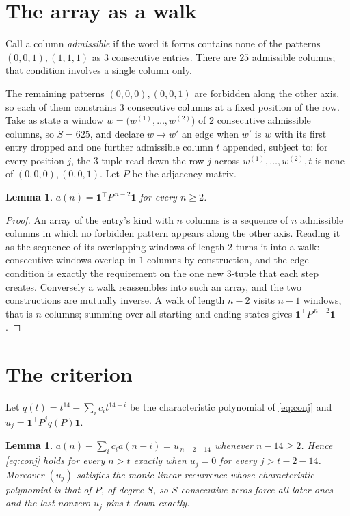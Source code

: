 \documentclass[11pt,a4paper]{article}
\theoremstyle{plain}
\newtheorem{lemma}[theorem]{Lemma}
\theoremstyle{definition}
\begin{document}
\section{The array as a walk}

Call a column \emph{admissible} if the word it forms contains none of the patterns
$(0,0,1), (1,1,1)$ as $3$ consecutive entries. There are $25$ admissible columns; that condition
involves a single column only.

The remaining patterns $(0,0,0), (0,0,1)$ are forbidden along the other axis, so each of them
constrains $3$ consecutive columns at a fixed position of the row. Take as state a
window $w=\bigl(w^{(1)},\dots,w^{(2)}\bigr)$ of $2$ consecutive admissible
columns, so $S=625$, and declare $w\to w'$ an edge when $w'$ is $w$ with its first entry
dropped and one further admissible column $t$ appended, subject to: for every position
$j$, the $3$-tuple read down the row $j$ across $w^{(1)},\dots,w^{(2)},t$
is none of $(0,0,0), (0,0,1)$. Let $P$ be the adjacency matrix.

\begin{lemma}\label{lem:walk}
$a(n)=\mathbf{1}^{\!\top}P^{\,n-2}\mathbf{1}$ for every $n\ge2$.
\end{lemma}

\begin{proof}
An array of the entry's kind with $n$ columns is a sequence of $n$ admissible columns in
which no forbidden pattern appears along the other axis. Reading it as the sequence of its
overlapping windows of length $2$ turns it into a walk: consecutive windows overlap in
$1$ columns by construction, and the edge condition is exactly the requirement on the one
new $3$-tuple that each step creates. Conversely a walk reassembles into such an array,
and the two constructions are mutually inverse. A walk of length $n-2$ visits $n-1$
windows, that is $n$ columns; summing over all starting and ending states gives
$\mathbf{1}^{\!\top}P^{\,n-2}\mathbf{1}$.
\end{proof}

\section{The criterion}

Let $q(t)=t^{14}-\sum_i c_i t^{14-i}$ be the characteristic polynomial of
\eqref{eq:conj} and $u_j=\mathbf{1}^{\!\top}P^{j}q(P)\mathbf{1}$.

\begin{lemma}\label{lem:crit}
$a(n)-\sum_i c_i a(n-i)=u_{\,n-2-14}$ whenever $n-14\ge2$. Hence
\eqref{eq:conj} holds for every $n>t$ exactly when $u_j=0$ for every
$j>t-2-14$. Moreover $(u_j)$ satisfies the monic linear recurrence whose
characteristic polynomial is that of $P$, of degree $S$, so $S$ consecutive zeros force all
later ones and the last nonzero $u_j$ pins $t$ down exactly.
\end{lemma}
\end{document}
